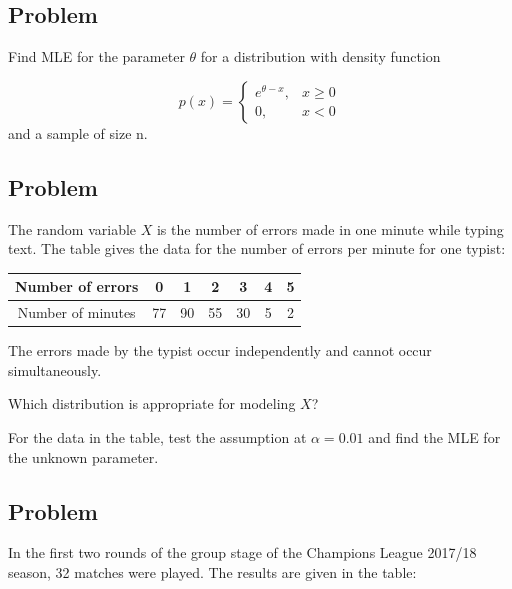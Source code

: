 \documentclass[a4paper, 12pt]{article}
\begin{document}
\subsection{Problem} Find MLE for the parameter $\theta$ for a distribution with density function 

\[
p(x)=
\begin{cases}
  e^{\theta-x}, & x \geq 0 \\
  0, & x < 0
\end{cases}  
\]
and a sample of size n.


\subsection{Problem}
The random variable $X$ is the number of errors made in one minute while typing text. The table gives the data for the number of errors per minute for one typist:

\begin{table}[h!]
\centering
\begin{tabular}{|c|c|c|c|c|c|c|}
\hline
Number of errors  & 0  & 1  & 2  & 3  & 4 & 5 \\ \hline
Number of minutes & 77 & 90 & 55 & 30 & 5 & 2 \\ \hline
\end{tabular}
\end{table}


The errors made by the typist occur independently and cannot occur simultaneously.

Which distribution is appropriate for modeling $X$?

For the data in the table, test the assumption at $\alpha =0.01$ and find the MLE for the unknown parameter.

\subsection{Problem}

In the first two rounds of the group stage of the Champions League 2017/18 season, 32 matches were played. The results are given in the table:
\end{document}
